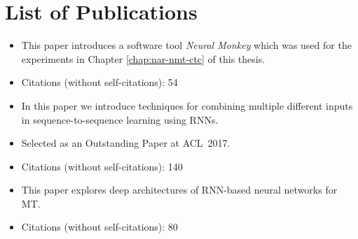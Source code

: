 \chapter*{List of Publications}




\noindent{}
\begin{itemize}[noitemsep,topsep=0pt]

\item This paper introduces a software tool \emph{Neural Monkey} which was used
  for the experiments in Chapter \ref{chap:nar-nmt-ctc} of this thesis.

\item Citations (without self-citations): 54
\end{itemize}\vspace{.5\baselineskip}

\noindent{}
\begin{itemize}[noitemsep,topsep=0pt]

\item In this paper we introduce techniques for combining multiple different
  inputs in sequence-to-sequence learning using RNNs.
\item Selected as an Outstanding Paper at ACL~2017.

\item Citations (without self-citations): 140
\end{itemize}\vspace{.5\baselineskip}

\noindent{}
\begin{itemize}[noitemsep,topsep=0pt]

\item This paper explores deep architectures of RNN-based neural networks for
  MT.

\item Citations (without self-citations): 80
\end{itemize}\vspace{.5\baselineskip}

